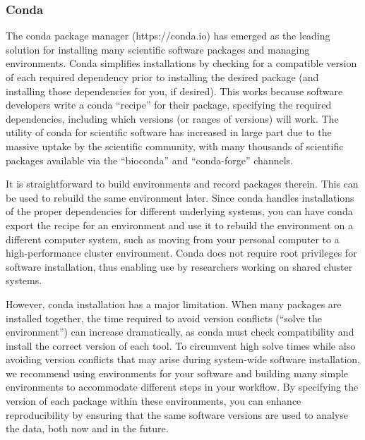 \documentclass[10pt,letterpaper]{article}
\begin{document}
\begin{greybox}{\subsubsection*{Conda}

The conda package manager (https://conda.io) has emerged as the leading solution for installing many scientific software packages and managing environments. 
Conda simplifies installations by checking for a compatible version of each required dependency prior to installing the desired package (and installing those dependencies for you, if desired). 
This works because software developers write a conda “recipe” for their package, specifying the required dependencies, including which versions (or ranges of versions) will work. 
The utility of conda for scientific software has increased in large part due to the massive uptake by the scientific community, with many thousands of scientific packages available via the “bioconda” and “conda-forge” channels. 

It is straightforward to build environments and record packages therein. 
This can be used to rebuild the same environment later. Since conda handles installations of the proper dependencies for different underlying systems, you can have conda export the recipe for an environment and use it to rebuild the environment on a different computer system, such as moving from your personal computer to a high-performance cluster environment. 
Conda does not require root privileges for software installation, thus enabling use by researchers working on shared cluster systems.

However, conda installation has a major limitation. 
When many packages are installed together, the time required to avoid version conflicts (“solve the environment”) can increase dramatically, as conda must check compatibility and install the correct version of each tool. 
To circumvent high solve times while also avoiding version conflicts that may arise during system-wide software installation, we recommend using environments for your software and building many simple environments to accommodate different steps in your workflow. 
By specifying the version of each package within these environments, you can enhance reproducibility by ensuring that the same software versions are used to analyse the data, both now and in the future. }
\end{greybox}
\end{document}
